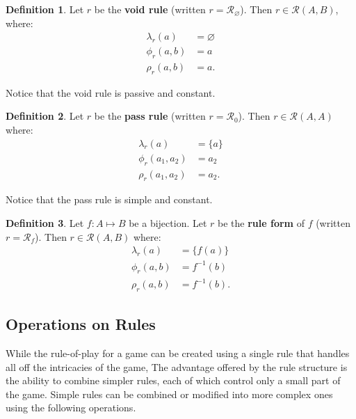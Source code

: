 \documentclass{article}
\theoremstyle{definition}
\newtheorem{definition}{Definition}[subsection]
\theoremstyle{plain}
\def\rule{\mathcal{R}}
\begin{document}
\begin{definition}
  Let $ r $ be the \textbf{void rule}
  (written $ r = \rule_\varnothing $).
  Then $ r \in \rule (A, B) $, where:
  \begin{align}
    \lambda_r (a)    & = \varnothing \\
       \phi_r (a, b) & = a \\
       \rho_r (a, b) & = a.
  \end{align}
\end{definition}

Notice that the void rule is passive and constant.

\begin{definition}
  Let $ r $ be the \textbf{pass rule}
  (written $ r = \rule_0 $).
  Then $ r \in \rule (A, A) $ where:
  \begin{align}
    \lambda_r (a)        & = \{ a \} \\
       \phi_r (a_1, a_2) & =  a_2 \\
       \rho_r (a_1, a_2) & =  a_2.
  \end{align}
\end{definition}

Notice that the pass rule is simple and constant.

\begin{definition}
  Let $ f : A \mapsto B $ be a bijection.
  Let $ r $ be the \textbf{rule form} of $ f $
  (written $ r = \rule_f $).
  Then $ r \in \rule (A, B) $ where:
  \begin{align}
    \lambda_r (a)    & = \{ f (a) \} \\
       \phi_r (a, b) & = f^{-1} (b) \\
       \rho_r (a, b) & = f^{-1} (b).
  \end{align}
\end{definition}

\subsection{Operations on Rules} %

While the rule-of-play for a game can be created using a single rule
that handles all off the intricacies of the game,
The advantage offered by the rule structure
is the ability to combine simpler rules,
each of which control only a small part of the game.
Simple rules can be combined or modified into more complex ones using the following operations.
\end{document}
